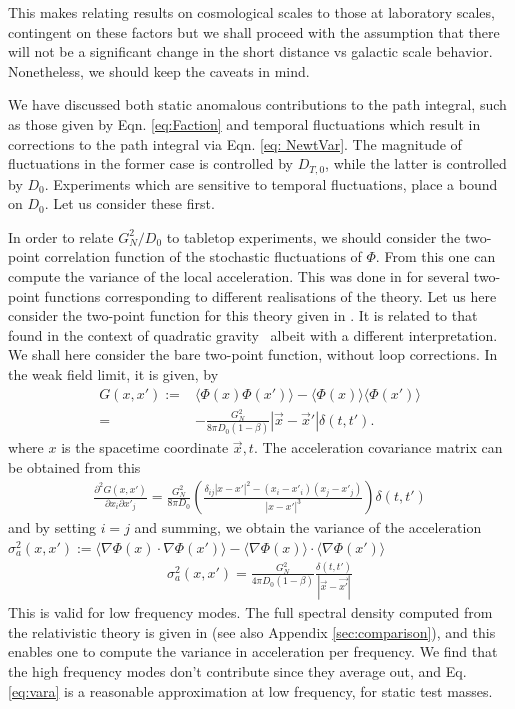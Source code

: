 \documentclass[aps,pra,amsmath,amssymb,amsthm,floatfix,nofootinbib,notitlepage,superscriptaddress,10pt]{revtex4-2}
\begin{document}
This makes relating results on cosmological scales to those at laboratory scales, contingent on these factors but we shall proceed with the assumption that there will not be a significant change in the short distance vs galactic scale behavior. Nonetheless, we should keep the caveats in mind. 

We have discussed both static anomalous contributions to the path integral, such as those given by Eqn. \eqref{eq:Faction} and temporal fluctuations which result in corrections to the path integral via Eqn. \eqref{eq: NewtVar}. The magnitude of fluctuations in the former case is controlled by $D_{T,0}$, while the latter is controlled by $D_0$. Experiments which are sensitive to temporal fluctuations, place a bound on $D_0$. Let us consider these first.

In order to relate $G_N^2/D_0$ to tabletop experiments, we should consider
the two-point correlation function of the stochastic fluctuations of $\Phi$.  From this one can compute the variance of the local acceleration. This was done in \cite{oppenheim2023gravitationally} for several two-point functions corresponding to different realisations of the theory.
Let us here consider the two-point function for this theory given in \cite{grudka2023renormalisable}. It is related to that found in the context of quadratic gravity~\cite{stelle1978classical} albeit with a different interpretation. We shall here consider the bare two-point function, without loop corrections. In the weak field limit, it is given,  by~\cite{grudka2023renormalisable}
\begin{align}
	G(x,x'):=& \langle \Phi(x)\Phi(x')\rangle-\langle \Phi(x)\rangle\langle\Phi(x')\rangle
	\nonumber\\
	=&-\frac{G_N^2}{8 \pi D_0(1-\beta)}|\vec{x}-\vec{x}'|\delta(t,t').
	\label{eq:freedom--main}
\end{align}
where $x$ is the spacetime coordinate $\vec{x},t$.
The acceleration covariance matrix can be obtained from this
\begin{align}
	\frac{\partial^2 G(x,x')}{ \partial{x_i}\partial{x'_j}}=\frac{G_N^2}{8\pi D_{0}} \left( \frac{\delta_{ij} |x - x'|^2 - (x_i - x'_i)(x_j - x'_j)}{|x - x'|^3} \right)\delta(t,t')
\end{align}
and by setting $i=j$ and summing, we obtain the variance of the acceleration $\sigma^2_a(x,x'):=\langle\nabla\Phi(x)\cdot\nabla\Phi(x')\rangle-\langle\nabla\Phi(x)\rangle\cdot\langle\nabla\Phi(x')\rangle$
\begin{align}
	\sigma^2_a(x,x')=\frac{G_N^2}{4\pi D_{0}(1-\beta)}\frac{\delta(t,t')}{|\vec{x}-\vec{x'}|}
	\label{eq:vara}
\end{align}
This is valid for low frequency modes. The full spectral density computed from the relativistic theory is given in \cite{grudka2023renormalisable} (see also Appendix \ref{sec:comparison}), and this enables one to compute the variance in acceleration per frequency. We find that the high frequency modes don't contribute since they average out, and Eq. \eqref{eq:vara} is a reasonable approximation at low frequency, for static test masses.
\end{document}
